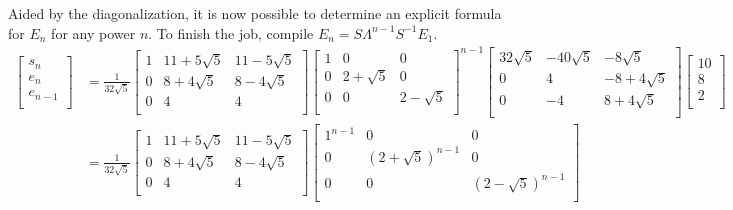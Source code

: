 \documentclass[titlepage]{article}
\begin{document}
Aided by the diagonalization, it is now possible to determine an explicit formula for $E_n$ for any power $n$. To finish the job, compile $E_n = S\Lambda^{n-1}S^{-1}E_1$.
\begingroup
\allowdisplaybreaks
\begin{align*}
    \begin{bmatrix}
        s_n\\
        e_n\\
        e_{n-1}\\
    \end{bmatrix}
    &= \frac{1}{32\sqrt{5}}
    \begin{bmatrix}
        1 & 11+5\sqrt{5} & 11-5\sqrt{5}\\
        0 & 8+4\sqrt{5} & 8-4\sqrt{5}\\
        0 & 4 & 4\\
    \end{bmatrix}
    \begin{bmatrix}
        1 & 0 & 0\\
        0 & 2+\sqrt{5} & 0\\
        0 & 0 & 2-\sqrt{5}\\
    \end{bmatrix}^{n-1}
    \begin{bmatrix}
        32\sqrt{5} & -40\sqrt{5} & -8\sqrt{5}\\
        0 & 4 & -8+4\sqrt{5}\\
        0 & -4 & 8+4\sqrt{5}\\
    \end{bmatrix}
    \begin{bmatrix}
        10\\
        8\\
        2\\
    \end{bmatrix}\\
    &= \frac{1}{32\sqrt{5}}
    \begin{bmatrix}
        1 & 11+5\sqrt{5} & 11-5\sqrt{5}\\
        0 & 8+4\sqrt{5} & 8-4\sqrt{5}\\
        0 & 4 & 4\\
    \end{bmatrix}
    \begin{bmatrix}
        1^{n-1} & 0 & 0\\
        0 & (2+\sqrt{5})^{n-1} & 0\\
        0 & 0 & (2-\sqrt{5})^{n-1}\\
    \end{bmatrix}

\end{align*}
\end{document}
